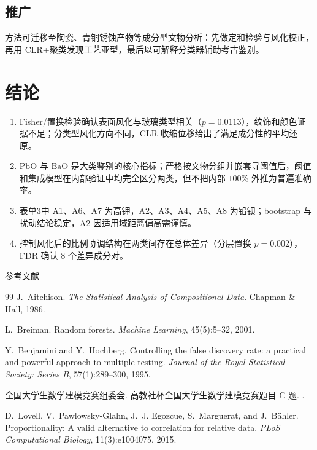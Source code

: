 \documentclass[fontset=windows, UTF8, 12pt, a4paper]{ctexart}
\begin{document}
\subsection{推广}
方法可迁移至陶瓷、青铜锈蚀产物等成分型文物分析：先做定和检验与风化校正，再用 CLR+聚类发现工艺亚型，最后以可解释分类器辅助考古鉴别。

\section{结论}

\begin{enumerate}[leftmargin=2em]
  \item Fisher/置换检验确认表面风化与玻璃类型相关（$p=0.0113$），纹饰和颜色证据不足；分类型风化方向不同，CLR 收缩位移给出了满足成分性的平均还原。
  \item $\mathrm{PbO}$ 与 $\mathrm{BaO}$ 是大类鉴别的核心指标；严格按文物分组并嵌套寻阈值后，阈值和集成模型在内部验证中均完全区分两类，但不把内部 $100\%$ 外推为普遍准确率。
  \item 表单3中 A1、A6、A7 为高钾，A2、A3、A4、A5、A8 为铅钡；bootstrap 与扰动结论稳定，A2 因适用域距离偏高需谨慎。
  \item 控制风化后的比例协调结构在两类间存在总体差异（分层置换 $p=0.002$），FDR 确认 8 个差异成分对。
\end{enumerate}

\clearpage
{}
{}
\begin{center}{\fontsize{15pt}{20pt}\heiti 参考文献}\end{center}
\vspace{0.6em}
\begin{thebibliography}{99}
\setlength{\itemsep}{0.35em}
J.~Aitchison.
\newblock \emph{The Statistical Analysis of Compositional Data}.
\newblock Chapman \& Hall, 1986.

L.~Breiman.
\newblock Random forests.
\newblock \emph{Machine Learning}, 45(5):5--32, 2001.

Y.~Benjamini and Y.~Hochberg.
\newblock Controlling the false discovery rate: a practical and powerful approach to multiple testing.
\newblock \emph{Journal of the Royal Statistical Society: Series B}, 57(1):289--300, 1995.

全国大学生数学建模竞赛组委会.
 高教社杯全国大学生数学建模竞赛题目 C 题.
.

D.~Lovell, V.~Pawlowsky-Glahn, J.~J. Egozcue, S.~Marguerat, and J.~Bähler.
\newblock Proportionality: A valid alternative to correlation for relative data.
\newblock \emph{PLoS Computational Biology}, 11(3):e1004075, 2015.
\end{thebibliography}
\end{document}
